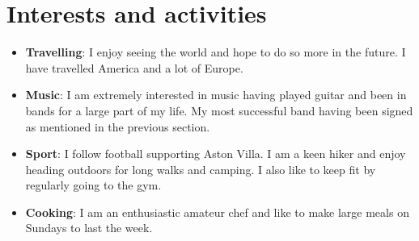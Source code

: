 \documentclass[11pt]{article}
\begin{document}
\section*{Interests and activities}
\begin{itemize}
\item \textbf{Travelling}: I enjoy seeing the world and hope to do so more in the future. I have travelled America and a lot of Europe.
\item \textbf{Music}: I am extremely interested in music having played guitar and been in bands for a large part of my life. My most successful band having been signed as mentioned in the previous section.
\item \textbf{Sport}: I follow football supporting Aston Villa. I am a keen hiker and enjoy heading outdoors for long walks and camping. I also like to keep fit by regularly going to the gym.
\item \textbf{Cooking}: I am an enthusiastic amateur chef and like to make large meals on Sundays to last the week.
\end{itemize}
\end{document}
